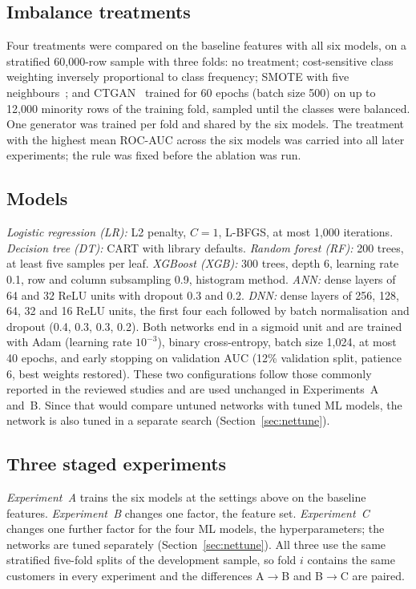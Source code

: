 \documentclass[conference]{IEEEtran}
\begin{document}
\subsection{Imbalance treatments}
Four treatments were compared on the baseline features with all six models, on a stratified 60,000-row sample with three folds: no treatment; cost-sensitive class weighting inversely proportional to class frequency; SMOTE with five neighbours~\cite{chawla2002smote}; and CTGAN~\cite{xu2019ctgan} trained for 60 epochs (batch size 500) on up to 12,000 minority rows of the training fold, sampled until the classes were balanced. One generator was trained per fold and shared by the six models. The treatment with the highest mean ROC-AUC across the six models was carried into all later experiments; the rule was fixed before the ablation was run.

\subsection{Models}
\emph{Logistic regression (LR):} L2 penalty, $C=1$, L-BFGS, at most 1,000 iterations. \emph{Decision tree (DT):} CART with library defaults. \emph{Random forest (RF):} 200 trees, at least five samples per leaf. \emph{XGBoost (XGB):} 300 trees, depth 6, learning rate 0.1, row and column subsampling 0.9, histogram method. \emph{ANN:} dense layers of 64 and 32 ReLU units with dropout 0.3 and 0.2. \emph{DNN:} dense layers of 256, 128, 64, 32 and 16 ReLU units, the first four each followed by batch normalisation and dropout (0.4, 0.3, 0.3, 0.2). Both networks end in a sigmoid unit and are trained with Adam (learning rate $10^{-3}$), binary cross-entropy, batch size 1,024, at most 40 epochs, and early stopping on validation AUC (12\% validation split, patience 6, best weights restored). These two configurations follow those commonly reported in the reviewed studies and are used unchanged in Experiments~A and~B. Since that would compare untuned networks with tuned ML models, the network is also tuned in a separate search (Section~\ref{sec:nettune}).

\subsection{Three staged experiments}
\emph{Experiment~A} trains the six models at the settings above on the baseline features. \emph{Experiment~B} changes one factor, the feature set. \emph{Experiment~C} changes one further factor for the four ML models, the hyperparameters; the networks are tuned separately (Section~\ref{sec:nettune}). All three use the same stratified five-fold splits of the development sample, so fold $i$ contains the same customers in every experiment and the differences A$\rightarrow$B and B$\rightarrow$C are paired.
\end{document}
